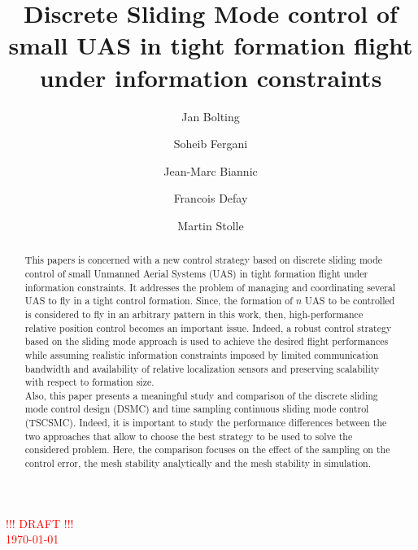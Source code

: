 \documentclass{ifacconf}
\begin{document}
\begin{frontmatter}

\title{Discrete Sliding Mode control of small UAS in tight formation flight under information constraints}

\author[First]{Jan Bolting}
\author[Second]{Soheib Fergani}
\author[Third]{Jean-Marc Biannic}
\author[Fourth]{Francois Defay}
\author[Fifth]{Martin Stolle}

\address[First]{National Institute of Standards and Technology,
   Boulder, CO 80305 USA (e-mail: author@ boulder.nist.gov).}
\address[Second]{Colorado State University,
   Fort Collins, CO 80523 USA (e-mail: author@lamar. colostate.edu)}
\address[Third]{Electrical Engineering Department,
   Seoul National University, Seoul, Korea, (e-mail: author@snu.ac.kr)}

\textcolor{red}{\Huge !!! DRAFT !!!\\ \normalsize \today \\ \currenttime}

\begin{abstract}
This papers is concerned with a new control strategy  based on discrete sliding mode control of small Unmanned Aerial Systems (UAS) in tight formation flight under information constraints. It addresses the problem of managing and coordinating several UAS to fly in a tight control formation. Since, the formation of $n$ UAS to be controlled is considered to fly in an arbitrary pattern in this work, then, high-performance relative position control becomes an important issue. Indeed, a robust control strategy based on the sliding mode approach is used to achieve the desired flight performances while assuming realistic information constraints imposed by limited communication bandwidth and availability of relative localization sensors and preserving scalability with respect to formation size.\\
Also, this paper presents a meaningful study and comparison of the discrete sliding mode control design (DSMC) and  time sampling continuous sliding mode control (TSCSMC). Indeed, it is important to study the performance differences between the two approaches that allow to choose the best strategy to be used to solve the considered problem. Here, the comparison focuses on the effect of the sampling on the control error, the mesh stability analytically and the mesh stability in simulation.\\





\end{abstract}
\end{frontmatter}
\end{document}
